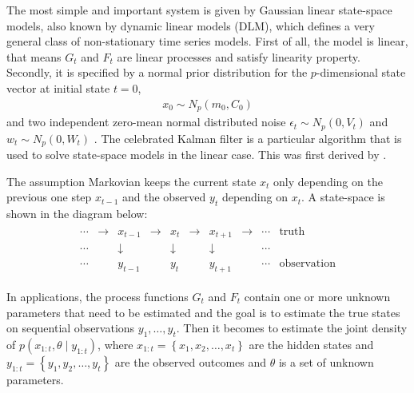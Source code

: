The most simple and important system is given by Gaussian linear state-space models, also known by dynamic linear models (DLM), which defines a very general class of non-stationary time series models. First of all, the model is linear, that means $G_t$ and $F_t$ are linear processes and satisfy linearity property. Secondly, it is specified by a normal prior distribution for the $p$-dimensional state vector at initial state $t=0$, 
\begin{align*}
x_0 \sim N_p(m_0,C_0)
\end{align*} 
and two independent zero-mean normal distributed noise $\epsilon_t \sim N_p(0,V_t)$ and $w_t \sim N_p(0,W_t)$ \citep{petris2009dynamic}. The celebrated Kalman filter is a particular algorithm that is used to solve state-space models in the linear case. This was first derived by \cite{kalman1960new}.

The assumption Markovian keeps the current state $x_t$ only depending on the previous one step $x_{t-1}$ and the observed $y_t$ depending on $x_t$. A state-space is shown in the diagram below:
\begin{align*}
\begin{array}{cccccccccc}\cdots &\to &x_{t-1}&\to &x_{t}&\to &x_{t+1}&\to &\cdots &{\text{truth}}\\  
\cdots&&\downarrow &&\downarrow &&\downarrow && \cdots&\\ \cdots&&y_{t-1}&&y_{t}&&y_{t+1}&&\cdots &{\text{observation}}\end{array}
\end{align*}

In applications, the process functions $G_t$ and $F_t$ contain one or more unknown parameters that need to be estimated \citep{de1988likelihood} and the goal is to estimate the true states on sequential observations $y_1, \ldots, y_t$. Then it becomes to estimate the joint density of $p(x_{1:t},\theta \mid y_{1:t})$, where $x_{1:t} = \left\lbrace x_1, x_2, \ldots, x_t \right\rbrace$ are the hidden states and $y_{1:t} = \left\lbrace y_1, y_2, \ldots, y_t \right\rbrace$ are the observed outcomes and $\theta$ is a set of unknown parameters. 


